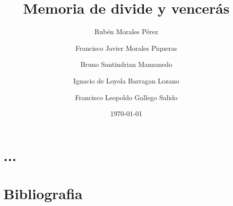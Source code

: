 \documentclass[11pt,spanish]{article} %
\title{Memoria de divide y vencerás}
\author{Rubén Morales Pérez
		\and Francisco Javier Morales Piqueras
		\and Bruno Santindrian Manzanedo
		\and Ignacio de Loyola Barragan Lozano
		\and Francisco Leopoldo Gallego Salido}
\date{\today}
\begin{document}
\maketitle
\tableofcontents %
\newpage
\setlength\parindent{0pt} %

\section{...}


\section{Bibliografia}

\newpage
\end{document}
